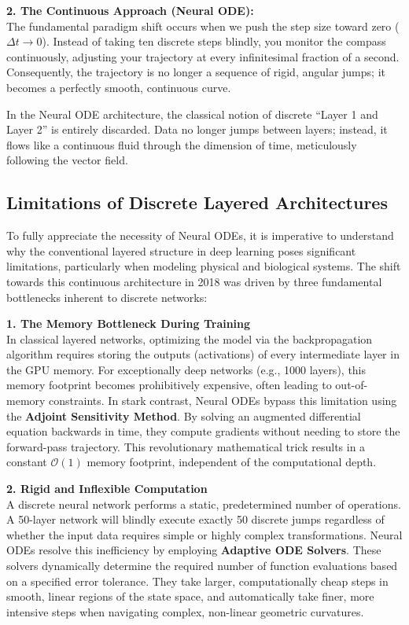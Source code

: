 \documentclass[12pt, a4paper]{article}
\begin{document}
	\vspace{0.3cm}
	\noindent \textbf{2. The Continuous Approach (Neural ODE):} \\
	The fundamental paradigm shift occurs when we push the step size toward zero ($\Delta t \to 0$). Instead of taking ten discrete steps blindly, you monitor the compass continuously, adjusting your trajectory at every infinitesimal fraction of a second. Consequently, the trajectory is no longer a sequence of rigid, angular jumps; it becomes a perfectly smooth, continuous curve. 
	
	In the Neural ODE architecture, the classical notion of discrete ``Layer 1 and Layer 2'' is entirely discarded. Data no longer jumps between layers; instead, it flows like a continuous fluid through the dimension of time, meticulously following the vector field.
	
	\subsection{Limitations of Discrete Layered Architectures}
	
	To fully appreciate the necessity of Neural ODEs, it is imperative to understand why the conventional layered structure in deep learning poses significant limitations, particularly when modeling physical and biological systems. The shift towards this continuous architecture in 2018 was driven by three fundamental bottlenecks inherent to discrete networks:
	
	\vspace{0.3cm}
	\noindent \textbf{1. The Memory Bottleneck During Training} \\
	In classical layered networks, optimizing the model via the backpropagation algorithm requires storing the outputs (activations) of every intermediate layer in the GPU memory. For exceptionally deep networks (e.g., 1000 layers), this memory footprint becomes prohibitively expensive, often leading to out-of-memory constraints. In stark contrast, Neural ODEs bypass this limitation using the \textbf{Adjoint Sensitivity Method}. By solving an augmented differential equation backwards in time, they compute gradients without needing to store the forward-pass trajectory. This revolutionary mathematical trick results in a constant $\mathcal{O}(1)$ memory footprint, independent of the computational depth.
	
	\vspace{0.3cm}
	\noindent \textbf{2. Rigid and Inflexible Computation} \\
	A discrete neural network performs a static, predetermined number of operations. A 50-layer network will blindly execute exactly 50 discrete jumps regardless of whether the input data requires simple or highly complex transformations. Neural ODEs resolve this inefficiency by employing \textbf{Adaptive ODE Solvers}. These solvers dynamically determine the required number of function evaluations based on a specified error tolerance. They take larger, computationally cheap steps in smooth, linear regions of the state space, and automatically take finer, more intensive steps when navigating complex, non-linear geometric curvatures.
	
\end{document}
